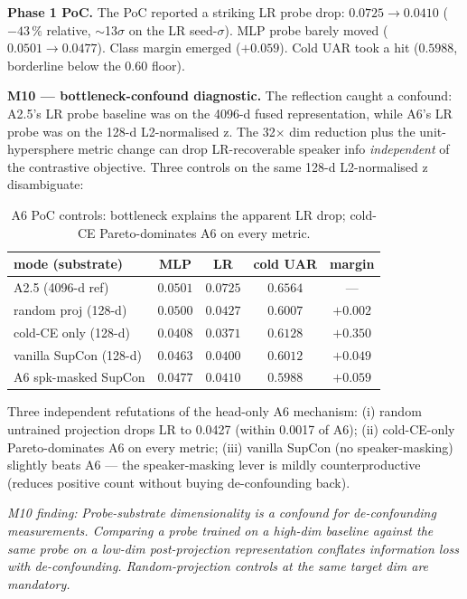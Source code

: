 \textbf{Phase 1 PoC.} The PoC reported a striking LR probe drop: $0.0725 \to 0.0410$ ($-43\,\%$ relative, $\sim$13$\sigma$ on the LR seed-$\sigma$). MLP probe barely moved ($0.0501 \to 0.0477$). Class margin emerged ($+0.059$). Cold UAR took a hit ($0.5988$, borderline below the 0.60 floor).

\textbf{M10 — bottleneck-confound diagnostic.} The reflection caught a confound: A2.5's LR probe baseline was on the 4096-d fused representation, while A6's LR probe was on the 128-d L2-normalised z. The 32$\times$ dim reduction plus the unit-hypersphere metric change can drop LR-recoverable speaker info \emph{independent} of the contrastive objective. Three controls on the same 128-d L2-normalised z disambiguate:

\begin{table}[t]
\centering\small
\caption{A6 PoC controls: bottleneck explains the apparent LR drop; cold-CE Pareto-dominates A6 on every metric.}
\label{tab:a6_controls}
\begin{tabular}{lcccc}
\toprule
mode (substrate)        & MLP   & LR    & cold UAR & margin \\
\midrule
A2.5 (4096-d ref)       & $0.0501$ & $0.0725$ & $0.6564$ & --- \\
random proj (128-d)     & $0.0500$ & $0.0427$ & $0.6007$ & $+0.002$ \\
cold-CE only (128-d)    & $0.0408$ & $\mathbf{0.0371}$ & $\mathbf{0.6128}$ & $\mathbf{+0.350}$ \\
vanilla SupCon (128-d)  & $0.0463$ & $0.0400$ & $0.6012$ & $+0.049$ \\
A6 spk-masked SupCon    & $0.0477$ & $0.0410$ & $0.5988$ & $+0.059$ \\
\bottomrule
\end{tabular}
\end{table}

Three independent refutations of the head-only A6 mechanism: (i) random untrained projection drops LR to 0.0427 (within 0.0017 of A6); (ii) cold-CE-only Pareto-dominates A6 on every metric; (iii) vanilla SupCon (no speaker-masking) slightly beats A6 — the speaker-masking lever is mildly counterproductive (reduces positive count without buying de-confounding back).

\textit{M10 finding:} \emph{Probe-substrate dimensionality is a confound for de-confounding measurements. Comparing a probe trained on a high-dim baseline against the same probe on a low-dim post-projection representation conflates information loss with de-confounding. Random-projection controls at the same target dim are mandatory.}


